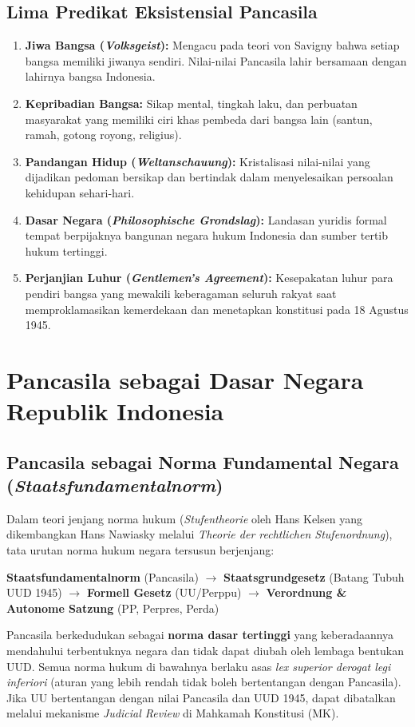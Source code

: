 \documentclass[10pt,a4paper]{article}
\begin{document}
\subsection{Lima Predikat Eksistensial Pancasila}
\begin{enumerate}
  \item \textbf{Jiwa Bangsa (\textit{Volksgeist}):} Mengacu pada teori von Savigny bahwa setiap bangsa memiliki jiwanya sendiri. Nilai-nilai Pancasila lahir bersamaan dengan lahirnya bangsa Indonesia.
  \item \textbf{Kepribadian Bangsa:} Sikap mental, tingkah laku, dan perbuatan masyarakat yang memiliki ciri khas pembeda dari bangsa lain (santun, ramah, gotong royong, religius).
  \item \textbf{Pandangan Hidup (\textit{Weltanschauung}):} Kristalisasi nilai-nilai yang dijadikan pedoman bersikap dan bertindak dalam menyelesaikan persoalan kehidupan sehari-hari.
  \item \textbf{Dasar Negara (\textit{Philosophische Grondslag}):} Landasan yuridis formal tempat berpijaknya bangunan negara hukum Indonesia dan sumber tertib hukum tertinggi.
  \item \textbf{Perjanjian Luhur (\textit{Gentlemen's Agreement}):} Kesepakatan luhur para pendiri bangsa yang mewakili keberagaman seluruh rakyat saat memproklamasikan kemerdekaan dan menetapkan konstitusi pada 18 Agustus 1945.
\end{enumerate}

\section{Pancasila sebagai Dasar Negara Republik Indonesia}

\subsection{Pancasila sebagai Norma Fundamental Negara (\textit{Staatsfundamentalnorm})}
Dalam teori jenjang norma hukum (\textit{Stufentheorie} oleh Hans Kelsen yang dikembangkan Hans Nawiasky melalui \textit{Theorie der rechtlichen Stufenordnung}), tata urutan norma hukum negara tersusun berjenjang:
\begin{center}
\textbf{Staatsfundamentalnorm} (Pancasila) $\rightarrow$ \textbf{Staatsgrundgesetz} (Batang Tubuh UUD 1945) $\rightarrow$ \textbf{Formell Gesetz} (UU/Perppu) $\rightarrow$ \textbf{Verordnung \& Autonome Satzung} (PP, Perpres, Perda)
\end{center}
\begin{conceptbox}
Pancasila berkedudukan sebagai \textbf{norma dasar tertinggi} yang keberadaannya mendahului terbentuknya negara dan tidak dapat diubah oleh lembaga bentukan UUD. Semua norma hukum di bawahnya berlaku asas \textit{lex superior derogat legi inferiori} (aturan yang lebih rendah tidak boleh bertentangan dengan Pancasila). Jika UU bertentangan dengan nilai Pancasila dan UUD 1945, dapat dibatalkan melalui mekanisme \textit{Judicial Review} di Mahkamah Konstitusi (MK).
\end{conceptbox}
\end{document}
